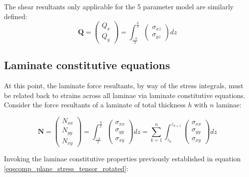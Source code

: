 The shear resultants only applicable for the 5 parameter model are similarly defined:
\begin{equation} 
\mathbf{Q} = 
\begin{pmatrix}
Q_{x} \\
Q_{y} 
\end{pmatrix}
=
{\int_{\frac{-h}{2}}^{\frac{h}{2}}
	\begin{pmatrix}
	\sigma_{xz} \\
	\sigma_{yz} 
	\end{pmatrix}}
dz
\label{eqscomp_force_resultants2}
\end{equation}

\subsection{Laminate constitutive equations}

At this point, the laminate force resultants, by way of the stress integrals, must be related back to strains across all laminae via laminate constitutive equations. Consider the force resultants of a laminate of total thickness $h$ with $n$ laminae:

\begin{equation}
\mathbf{N} = 
\begin{pmatrix}
N_{xx} \\
N_{yy} \\
N_{xy} 
\end{pmatrix}
=
{\int_{\frac{-h}{2}}^{\frac{h}{2}}
	\begin{pmatrix}
	\sigma_{xx} \\
	\sigma_{yy} \\
	\sigma_{xy} 
	\end{pmatrix}}
dz
=
\sum_{k=1}^n
\int_{z_k}^{z_{k+1}}
	\begin{pmatrix}
	\sigma_{xx} \\
	\sigma_{yy} \\
	\sigma_{xy} 
	\end{pmatrix}
dz
\label{eqscomp_laminate_constitutive1}
\end{equation}

Invoking the laminae constitutive properties previously established in equation \ref{eqscomp_plane_stress_tensor_rotated}:

